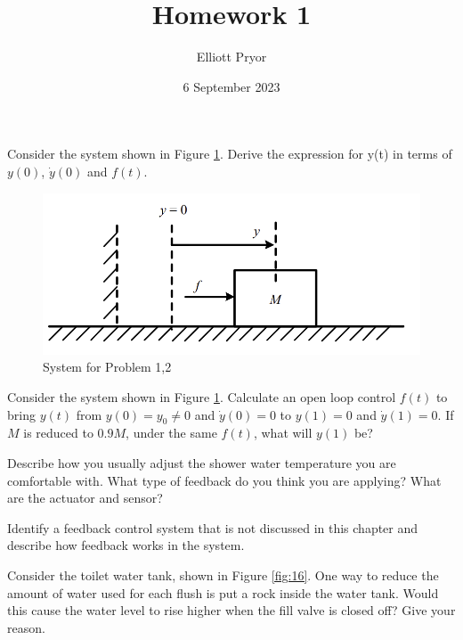 \documentclass[11pt]{article}
\title{Homework 1}
\author{Elliott Pryor}
\date{6 September 2023}
\begin{document}
\maketitle


Consider the system shown in Figure \ref{fig:1-1}. Derive the expression for y(t) in
terms of $y(0)$, $\dot{y}(0)$ and $f(t)$.

\begin{figure}[h] 
    \centering
    \includegraphics[width=0.55 \linewidth]{fig11.png}
    \caption{System for Problem 1,2}
    \label{fig:1-1}
\end{figure}

\soln




Consider the system shown in Figure \ref{fig:1-1}. Calculate an open loop control $f(t)$
to bring $y(t)$ from $y(0) = y_0 \neq 0$ and $\dot{y}(0) = 0$ to $y(1) = 0$ and $\dot{y}(1) = 0$. 
If $M$ is reduced to $0.9M$, under the same $f(t)$, what will $y(1)$ be?

\soln



Describe how you usually adjust the shower water temperature you are
comfortable with. What type of feedback do you think you are applying? What are the
actuator and sensor?

\soln





Identify a feedback control system that is not discussed in this chapter and
describe how feedback works in the system.

\soln





Consider the toilet water tank, shown in Figure \ref{fig:16}. One way to reduce the
amount of water used for each flush is put a rock inside the water tank. Would this cause
the water level to rise higher when the fill valve is closed off? Give your reason.
\end{document}

